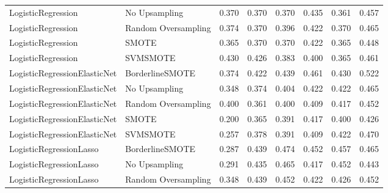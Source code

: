 \begin{tabular}{llllllll}
          LogisticRegression &       No Upsampling & 0.370 &                     0.370 &                 0.370 &                  0.435 &                                   0.361 &    0.457 \\
          LogisticRegression & Random Oversampling & 0.374 &                     0.370 &                 0.396 &                  0.422 &                                   0.370 &    0.465 \\
          LogisticRegression &               SMOTE & 0.365 &                     0.370 &                 0.370 &                  0.422 &                                   0.365 &    0.448 \\
          LogisticRegression &            SVMSMOTE & 0.430 &                     0.426 &                 0.383 &                  0.400 &                                   0.365 &    0.461 \\
LogisticRegressionElasticNet &     BorderlineSMOTE & 0.374 &                     0.422 &                 0.439 &                  0.461 &                                   0.430 &    0.522 \\
LogisticRegressionElasticNet &       No Upsampling & 0.348 &                     0.374 &                 0.404 &                  0.422 &                                   0.422 &    0.465 \\
LogisticRegressionElasticNet & Random Oversampling & 0.400 &                     0.361 &                 0.400 &                  0.409 &                                   0.417 &    0.452 \\
LogisticRegressionElasticNet &               SMOTE & 0.200 &                     0.365 &                 0.391 &                  0.417 &                                   0.400 &    0.426 \\
LogisticRegressionElasticNet &            SVMSMOTE & 0.257 &                     0.378 &                 0.391 &                  0.409 &                                   0.422 &    0.470 \\
     LogisticRegressionLasso &     BorderlineSMOTE & 0.287 &                     0.439 &                 0.474 &                  0.452 &                                   0.457 &    0.465 \\
     LogisticRegressionLasso &       No Upsampling & 0.291 &                     0.435 &                 0.465 &                  0.417 &                                   0.452 &    0.443 \\
     LogisticRegressionLasso & Random Oversampling & 0.348 &                     0.439 &                 0.452 &                  0.422 &                                   0.426 &    0.452 \\

\end{tabular}

